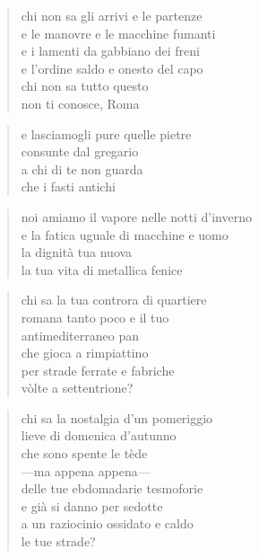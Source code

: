 \clearpage


\begin{verse}
    chi non sa gli arrivi e le partenze\\
    e le manovre e le macchine fumanti\\
    e i lamenti da gabbiano dei freni\\
    e l'ordine saldo e onesto del capo\\
    chi non sa tutto questo\\
    non ti conosce, Roma
\end{verse}

\begin{verse}
    e lasciamogli pure quelle pietre\\
    consunte dal gregario\\
    a chi di te non guarda\\
    che i fasti antichi
\end{verse}

\begin{verse}
    noi amiamo il vapore nelle notti d'inverno\\
    e la fatica uguale di macchine e uomo\\
    la dignità tua nuova\\
    la tua vita di metallica fenice
\end{verse}

\clearpage


\begin{verse}
    chi sa la tua controra di quartiere\\
    romana tanto poco e il tuo\\
    antimediterraneo pan\\
    che gioca a rimpiattino\\
    per strade ferrate e fabriche\\
    vòlte a settentrione?
\end{verse}

\begin{verse}
    chi sa la nostalgia d'un pomeriggio\\
    lieve di domenica d'autunno\\
    che sono spente le tède\\
    —ma appena appena—\\
    delle tue ebdomadarie tesmoforie\\
    e già si danno per sedotte\\
    a un raziocinio ossidato e caldo\\
    le tue strade?
\end{verse}

